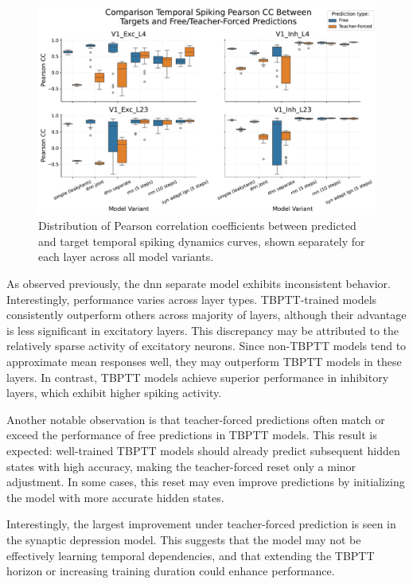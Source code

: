 \begin{figure}
    \centering
    \includegraphics[width=\linewidth]{img/plots/boxplot_model_comparison_synchrony_pearson_layers.pdf}
    \caption{Distribution of Pearson correlation coefficients between predicted and target temporal spiking dynamics curves, shown separately for each layer across all model variants.}
    \label{fig:boxplot_models_pearson_synchrony_different_layers}
\end{figure}

As observed previously, the dnn separate model exhibits inconsistent behavior. Interestingly, performance varies across layer types. TBPTT-trained models consistently outperform others across majority of layers, although their advantage is less significant in excitatory layers. This discrepancy may be attributed to the relatively sparse activity of excitatory neurons. Since non-TBPTT models tend to approximate mean responses well, they may outperform TBPTT models in these layers. In contrast, TBPTT models achieve superior performance in inhibitory layers, which exhibit higher spiking activity.

Another notable observation is that teacher-forced predictions often match or exceed the performance of free predictions in TBPTT models. This result is expected: well-trained TBPTT models should already predict subsequent hidden states with high accuracy, making the teacher-forced reset only a minor adjustment. In some cases, this reset may even improve predictions by initializing the model with more accurate hidden states.

Interestingly, the largest improvement under teacher-forced prediction is seen in the synaptic depression model. This suggests that the model may not be effectively learning temporal dependencies, and that extending the TBPTT horizon or increasing training duration could enhance performance.

